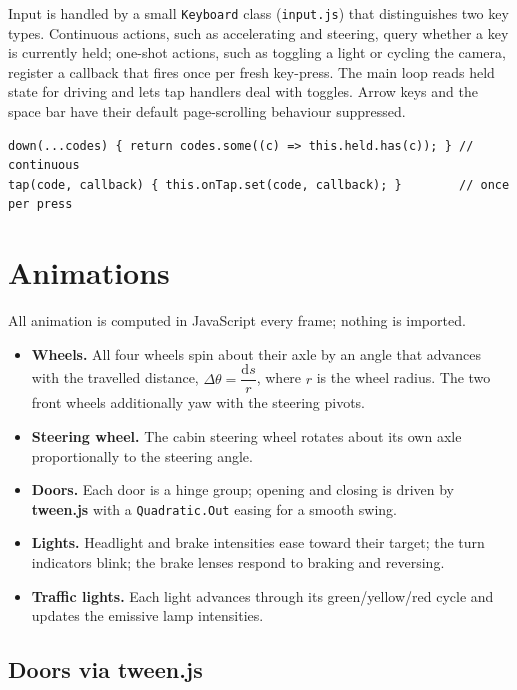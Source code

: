 \documentclass[11pt]{article}
\newcommand{\code}[1]{\texttt{#1}}
\begin{document}
Input is handled by a small \code{Keyboard} class (\code{input.js}) that
distinguishes two key types. Continuous actions, such as accelerating and
steering, query whether a key is currently held; one-shot actions, such as
toggling a light or cycling the camera, register a callback that fires once per
fresh key-press. The main loop reads held state for driving and lets tap handlers
deal with toggles. Arrow keys and the space bar have their default page-scrolling
behaviour suppressed.

\begin{lstlisting}[caption={Held vs.\ one-shot keys (\code{input.js}).}]
down(...codes) { return codes.some((c) => this.held.has(c)); } // continuous
tap(code, callback) { this.onTap.set(code, callback); }        // once per press
\end{lstlisting}

\section{Animations}

All animation is computed in JavaScript every frame; nothing is imported.

\begin{itemize}
  \item \textbf{Wheels.} All four wheels spin about their axle by an angle that
    advances with the travelled distance, $\Delta\theta = \dfrac{\mathrm{d}s}{r}$,
    where $r$ is the wheel radius. The two front wheels additionally yaw with the
    steering pivots.
  \item \textbf{Steering wheel.} The cabin steering wheel rotates about its own
    axle proportionally to the steering angle.
  \item \textbf{Doors.} Each door is a hinge group; opening and closing is driven
    by \textbf{tween.js} with a \code{Quadratic.Out} easing for a smooth swing.
  \item \textbf{Lights.} Headlight and brake intensities ease toward their target;
    the turn indicators blink; the brake lenses respond to braking and reversing.
  \item \textbf{Traffic lights.} Each light advances through its
    green/yellow/red cycle and updates the emissive lamp intensities.
\end{itemize}

\subsection{Doors via tween.js}
\end{document}
